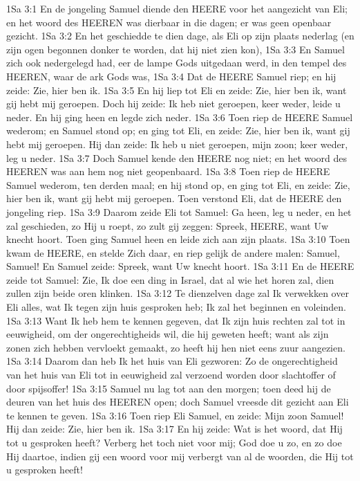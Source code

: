 1Sa 3:1  En de jongeling Samuel diende den HEERE voor het aangezicht van Eli; en het woord des HEEREN was dierbaar in die dagen; er was geen openbaar gezicht.
1Sa 3:2  En het geschiedde te dien dage, als Eli op zijn plaats nederlag (en zijn ogen begonnen donker te worden, dat hij niet zien kon),
1Sa 3:3  En Samuel zich ook nedergelegd had, eer de lampe Gods uitgedaan werd, in den tempel des HEEREN, waar de ark Gods was,
1Sa 3:4  Dat de HEERE Samuel riep; en hij zeide: Zie, hier ben ik.
1Sa 3:5  En hij liep tot Eli en zeide: Zie, hier ben ik, want gij hebt mij geroepen. Doch hij zeide: Ik heb niet geroepen, keer weder, leide u neder. En hij ging heen en legde zich neder.
1Sa 3:6  Toen riep de HEERE Samuel wederom; en Samuel stond op; en ging tot Eli, en zeide: Zie, hier ben ik, want gij hebt mij geroepen. Hij dan zeide: Ik heb u niet geroepen, mijn zoon; keer weder, leg u neder.
1Sa 3:7  Doch Samuel kende den HEERE nog niet; en het woord des HEEREN was aan hem nog niet geopenbaard.
1Sa 3:8  Toen riep de HEERE Samuel wederom, ten derden maal; en hij stond op, en ging tot Eli, en zeide: Zie, hier ben ik, want gij hebt mij geroepen. Toen verstond Eli, dat de HEERE den jongeling riep.
1Sa 3:9  Daarom zeide Eli tot Samuel: Ga heen, leg u neder, en het zal geschieden, zo Hij u roept, zo zult gij zeggen: Spreek, HEERE, want Uw knecht hoort. Toen ging Samuel heen en leide zich aan zijn plaats.
1Sa 3:10  Toen kwam de HEERE, en stelde Zich daar, en riep gelijk de andere malen: Samuel, Samuel! En Samuel zeide: Spreek, want Uw knecht hoort.
1Sa 3:11  En de HEERE zeide tot Samuel: Zie, Ik doe een ding in Israel, dat al wie het horen zal, dien zullen zijn beide oren klinken.
1Sa 3:12  Te dienzelven dage zal Ik verwekken over Eli alles, wat Ik tegen zijn huis gesproken heb; Ik zal het beginnen en voleinden.
1Sa 3:13  Want Ik heb hem te kennen gegeven, dat Ik zijn huis rechten zal tot in eeuwigheid, om der ongerechtigheids wil, die hij geweten heeft; want als zijn zonen zich hebben vervloekt gemaakt, zo heeft hij hen niet eens zuur aangezien.
1Sa 3:14  Daarom dan heb Ik het huis van Eli gezworen: Zo de ongerechtigheid van het huis van Eli tot in eeuwigheid zal verzoend worden door slachtoffer of door spijsoffer!
1Sa 3:15  Samuel nu lag tot aan den morgen; toen deed hij de deuren van het huis des HEEREN open; doch Samuel vreesde dit gezicht aan Eli te kennen te geven.
1Sa 3:16  Toen riep Eli Samuel, en zeide: Mijn zoon Samuel! Hij dan zeide: Zie, hier ben ik.
1Sa 3:17  En hij zeide: Wat is het woord, dat Hij tot u gesproken heeft? Verberg het toch niet voor mij; God doe u zo, en zo doe Hij daartoe, indien gij een woord voor mij verbergt van al de woorden, die Hij tot u gesproken heeft!
